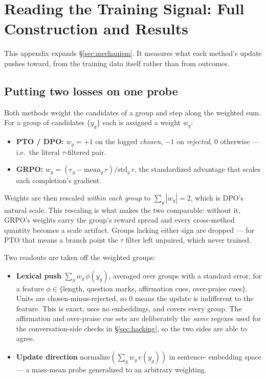 \section{Reading the Training Signal: Full Construction and Results}
\label{app:mechanism}

This appendix expands \S\ref{sec:mechanism}. It measures what each method's update pushes
toward, from the training data itself rather than from outcomes.

\subsection{Putting two losses on one probe}

Both methods weight the candidates of a group and step along the weighted sum. For a group
of candidates $\{y_g\}$ each is assigned a weight $w_g$:

\begin{itemize}\itemsep2pt
  \item \textbf{PTO / DPO:} $w_g = +1$ on the logged \emph{chosen}, $-1$ on
  \emph{rejected}, $0$ otherwise --- i.e.\ the literal $\tau$-filtered pair.
  \item \textbf{GRPO:} $w_g = (r_g - \mathrm{mean}_g\,r)/\mathrm{std}_g\,r$, the
  standardized advantage that scales each completion's gradient.
\end{itemize}

\noindent
Weights are then rescaled \emph{within each group} to $\sum_g |w_g| = 2$, which is DPO's
natural scale. This rescaling is what makes the two comparable: without it, GRPO's weights
carry the group's reward spread and every cross-method quantity becomes a scale artifact.
Groups lacking either sign are dropped --- for PTO that means a branch point the $\tau$
filter left unpaired, which never trained.

Two readouts are taken off the weighted groups:

\begin{itemize}\itemsep2pt
  \item \textbf{Lexical push} $\sum_g w_g\,\phi(y_g)$, averaged over groups with a standard
  error, for a feature $\phi \in \{$length, question marks, affirmation cues, over-praise
  cues$\}$. Units are chosen-minus-rejected, so $0$ means the update is indifferent to the
  feature. This is exact, uses no embeddings, and covers every group. The affirmation and
  over-praise cue sets are deliberately the \emph{same} regexes used for the
  conversation-side checks in \S\ref{sec:hacking}, so the two sides are able to agree.
  \item \textbf{Update direction} $\mathrm{normalize}(\sum_g w_g\, e(y_g))$ in sentence-
  embedding space --- a mass-mean probe generalized to an arbitrary weighting.
\end{itemize}

